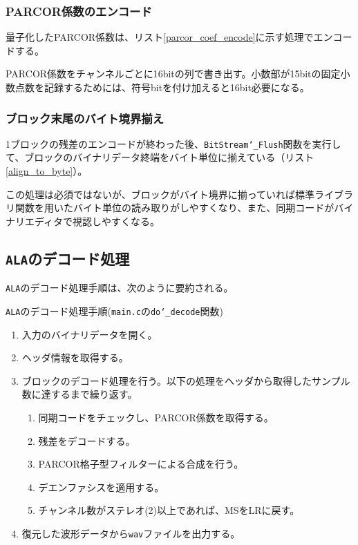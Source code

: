\documentclass[uplatex,dvipdfmx,b5j,10pt]{jsbook}
\theoremstyle{definition}
\begin{document}
\subsubsection{PARCOR係数のエンコード}

量子化したPARCOR係数は、リスト\ref{parcor_coef_encode}に示す処理でエンコードする。


PARCOR係数をチャンネルごとに16bitの列で書き出す。小数部が15bitの固定小数点数を記録するためには、符号bitを付け加えると16bit必要になる。

\subsubsection{ブロック末尾のバイト境界揃え}

1ブロックの残差のエンコードが終わった後、\texttt{BitStream\char`_Flush}関数を実行して、ブロックのバイナリデータ終端をバイト単位に揃えている（リスト\ref{align_to_byte}）。


この処理は必須ではないが、ブロックがバイト境界に揃っていれば標準ライブラリ関数を用いたバイト単位の読み取りがしやすくなり、また、同期コードがバイナリエディタで視認しやすくなる。

\subsection{\texttt{ALA}のデコード処理}

\texttt{ALA}のデコード処理手順は、次のように要約される。

\begin{itembox}[l]{\texttt{ALA}のデコード処理手順(\texttt{main.c}の\texttt{do\char`_decode}関数)}
  \begin{enumerate}
    \item 入力のバイナリデータを開く。
    \item ヘッダ情報を取得する。
    \item ブロックのデコード処理を行う。以下の処理をヘッダから取得したサンプル数に達するまで繰り返す。
      \begin{enumerate}
        \item 同期コードをチェックし、PARCOR係数を取得する。
        \item 残差をデコードする。
        \item PARCOR格子型フィルターによる合成を行う。
        \item デエンファシスを適用する。
        \item チャンネル数がステレオ(2)以上であれば、MSをLRに戻す。
      \end{enumerate}
    \item 復元した波形データから\texttt{wav}ファイルを出力する。
  \end{enumerate}
\end{itembox}
\end{document}
